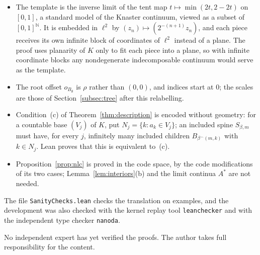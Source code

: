 \documentclass[11pt]{amsart}
\theoremstyle{definition}
\theoremstyle{remark}
\newcommand{\N}{\mathbb{N}}
\begin{document}
\begin{itemize}
\item The template is the inverse limit of the tent map $t\mapsto\min(2t,2-2t)$ on $[0,1]$, a standard model of the Knaster continuum, viewed as a subset of $[0,1]^\N$. It is embedded in $\ell^2$ by $(z_n)\mapsto(2^{-(n+1)}z_n)$, and each piece receives its own infinite block of coordinates of $\ell^2$ instead of a plane. The proof uses planarity of $K$ only to fit each piece into a plane, so with infinite coordinate blocks any nondegenerate indecomposable continuum would serve as the template.
\item The root offset $o_{B_\emptyset}$ is $\rho$ rather than $(0,0)$, and indices start at $0$; the scales are those of Section~\ref{subsec:tree} after this relabelling.
\item Condition~(c) of Theorem~\ref{thm:description} is encoded without geometry: for a countable base $(V_j)$ of $K$, put $N_j=\{k:a_k\in V_j\}$; an included spine $S_{\beta,m}$ must have, for every $j$, infinitely many included children $B_{\beta^\frown(m,k)}$ with $k\in N_j$. Lean proves that this is equivalent to~(c).
\item Proposition~\ref{prop:nlc} is proved in the code space, by the code modifications of its two cases; Lemma~\ref{lem:interiors}(b) and the limit continua $A^*$ are not needed.
\end{itemize}
The file \texttt{SanityChecks.lean} checks the translation on examples, and the development was also checked with the kernel replay tool \texttt{leanchecker} and with the independent type checker \texttt{nanoda}.

No independent expert has yet verified the proofs. The author takes full responsibility for the content.
\end{document}
